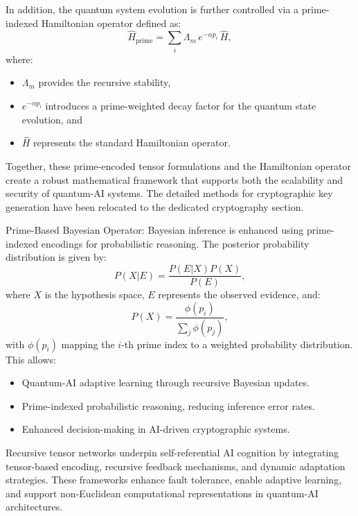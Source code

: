 \pa In addition, the quantum system evolution is further controlled via a prime-indexed Hamiltonian operator defined as:
\begin{equation}
\hat{H}_{\text{prime}} = \sum_{i} \Lambda_m \, e^{-\alpha p_i} \, \hat{H},
\end{equation}
where:
\begin{itemize}
    \item \(\Lambda_m\) provides the recursive stability,
    \item \(e^{-\alpha p_i}\) introduces a prime-weighted decay factor for the quantum state evolution, and
    \item \(\hat{H}\) represents the standard Hamiltonian operator.
\end{itemize}

Together, these prime-encoded tensor formulations and the Hamiltonian operator create a robust mathematical framework that supports both the scalability and security of quantum-AI systems. The detailed methods for cryptographic key generation have been relocated to the dedicated cryptography section.

\pa Prime-Based Bayesian Operator: Bayesian inference is enhanced using prime-indexed encodings for probabilistic reasoning. The posterior probability distribution is given by:
\begin{equation}
P(X | E) = \frac{P(E | X) P(X)}{P(E)},
\end{equation}
where $X$ is the hypothesis space, $E$ represents the observed evidence, and:
\begin{equation}
P(X) = \frac{\phi(p_i)}{\sum_{j} \phi(p_j)},
\end{equation}
with $\phi(p_i)$ mapping the $i$-th prime index to a weighted probability distribution. This allows:
\begin{itemize}
    \item Quantum-AI adaptive learning through recursive Bayesian updates.
    \item Prime-indexed probabilistic reasoning, reducing inference error rates.
    \item Enhanced decision-making in AI-driven cryptographic systems.
\end{itemize}


\pa Recursive tensor networks underpin self-referential AI cognition by integrating tensor-based encoding, recursive feedback mechanisms, and dynamic adaptation strategies. These frameworks enhance fault tolerance, enable adaptive learning, and support non-Euclidean computational representations in quantum-AI architectures.


